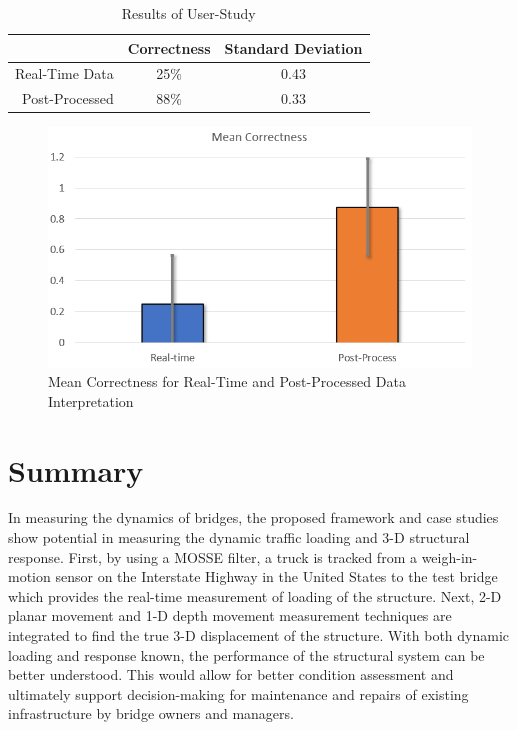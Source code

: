 \documentclass{sigchi}
\begin{document}
\begin{table}[ht]
\centering
\caption{Results of User-Study}
\label{table:resultsus}
\begin{tabular}{@{}rcc@{}}
\toprule
 & Correctness & Standard Deviation \\ \midrule
Real-Time Data & 25\% & 0.43 \\
Post-Processed & 88\% & 0.33 \\ \bottomrule
\end{tabular}
\end{table}

\begin{figure}[ht]
    \centering
    \includegraphics[width=\linewidth]{Figures/USResults.PNG}
    \caption{Mean Correctness for Real-Time and Post-Processed Data Interpretation}
    \label{fig:usresults}
\end{figure}
 
\section{Summary}

In measuring the dynamics of bridges, the proposed framework and case studies show potential in measuring the dynamic traffic loading and 3-D structural response. First, by using a MOSSE filter, a truck is tracked from a weigh-in-motion sensor on the Interstate Highway in the United States to the test bridge which provides the real-time measurement of loading of the structure. Next, 2-D planar movement and 1-D depth movement measurement techniques are integrated to find the true 3-D displacement of the structure. With both dynamic loading and response known, the performance of the structural system can be better understood. This would allow for better condition assessment and ultimately support decision-making for maintenance and repairs of existing infrastructure by bridge owners and managers. 
\end{document}
